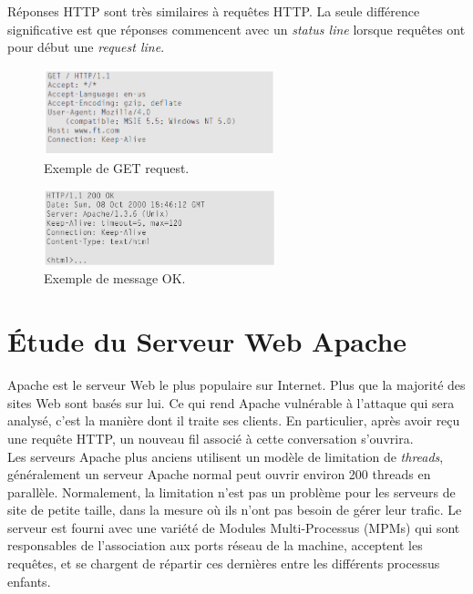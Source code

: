 \documentclass{article}
\begin{document}
\noindent
Réponses HTTP sont très similaires à requêtes HTTP. La seule différence significative est que réponses commencent avec un \textit{status line} lorsque
requêtes ont pour début une \textit{request line}.

\begin{figure}[H]
	\begin{center}
		\includegraphics[width=0.6\textwidth]{images/getRequest.png} %
		\caption{Exemple de GET request.}
                \label{get-request}
	\end{center}
\end{figure}

\begin{figure}[H]
	\begin{center}
		\includegraphics[width=0.6\textwidth]{images/ok.png} %
		\caption{Exemple de message OK.}
	\end{center}
\end{figure}

\section{Étude du Serveur Web Apache}
Apache est le serveur Web le plus populaire sur Internet. Plus que la majorité des sites Web sont basés sur lui. Ce qui rend Apache vulnérable à l'attaque qui sera analysé, c'est la manière dont il traite ses clients. En particulier, après avoir reçu une requête HTTP, un nouveau fil associé à cette conversation s'ouvrira. \\
Les serveurs Apache plus anciens utilisent un modèle de limitation de \textit{threads}, généralement un serveur Apache normal peut ouvrir environ 200 threads en parallèle. Normalement, la limitation n’est pas un problème pour les serveurs de site de petite taille, dans la mesure où ils n’ont pas besoin de gérer leur trafic.
Le serveur est fourni avec une variété de Modules Multi-Processus (MPMs) qui sont responsables de l'association aux ports réseau de la machine, acceptent les requêtes, et se chargent de répartir ces dernières entre les différents processus enfants. \\
\end{document}
